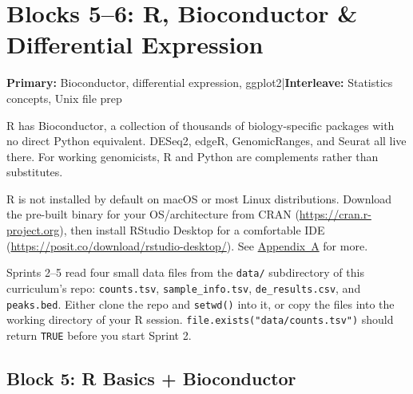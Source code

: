 \chapter{Blocks 5--6: R, Bioconductor \& Differential Expression}\label{chap:r}

\textbf{Primary:} Bioconductor, differential expression, ggplot2\quad|\quad\textbf{Interleave:} Statistics concepts, Unix file prep

\begin{brainbox}
R has Bioconductor, a collection of thousands of biology-specific packages with no direct Python equivalent. DESeq2, edgeR, GenomicRanges, and Seurat all live there. For working genomicists, R and Python are complements rather than substitutes.
\end{brainbox}

\begin{tipbox}
R is not installed by default on macOS or most Linux distributions. Download the pre-built binary for your OS/architecture from CRAN (\url{https://cran.r-project.org}), then install RStudio Desktop for a comfortable IDE (\url{https://posit.co/download/rstudio-desktop/}). See \hyperref[app:tools]{Appendix~A} for more.
\end{tipbox}

\begin{tipbox}
Sprints 2--5 read four small data files from the \texttt{data/} subdirectory of this curriculum's repo: \texttt{counts.tsv}, \texttt{sample\_info.tsv}, \texttt{de\_results.csv}, and \texttt{peaks.bed}. Either clone the repo and \texttt{setwd()} into it, or copy the files into the working directory of your R session. \texttt{file.exists("data/counts.tsv")} should return \texttt{TRUE} before you start Sprint 2.
\end{tipbox}


\section{Block 5: R Basics + Bioconductor}

